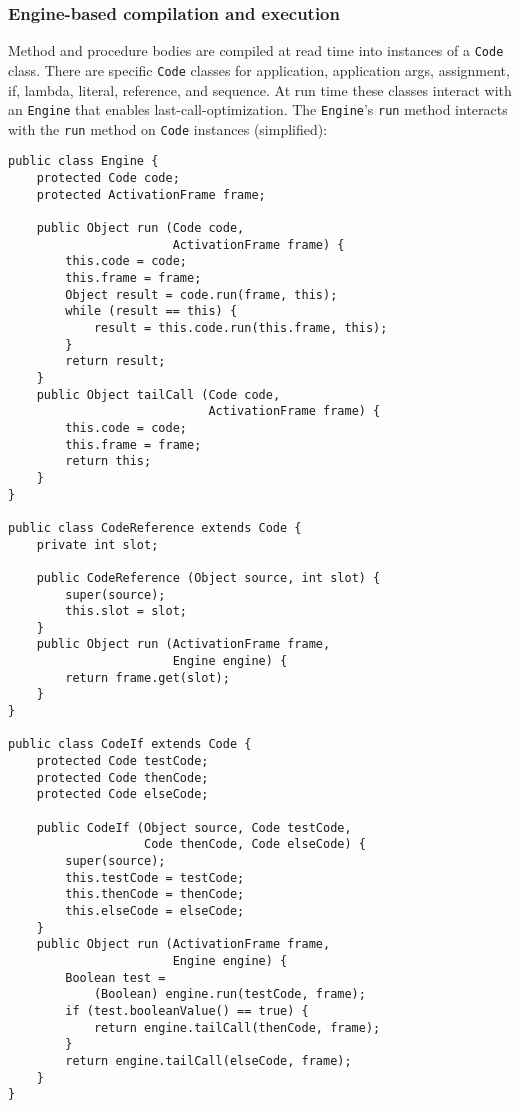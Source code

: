 \documentclass{acm_proc_article-sp}
\begin{document}
\subsubsection{Engine-based compilation and execution}

Method and procedure bodies are compiled at read time into instances
of a {\tt Code} class.  There are specific {\tt Code} classes for
application, application args, assignment, if, lambda, literal,
reference, and sequence.  At run time these classes interact with an
{\tt Engine} that enables last-call-optimization.  The {\tt Engine}'s
{\tt run} method interacts with the {\tt run} method on {\tt Code}
instances (simplified):

\small
\begin{verbatim}
public class Engine {
    protected Code code;
    protected ActivationFrame frame;

    public Object run (Code code,
                       ActivationFrame frame) {
        this.code = code;
        this.frame = frame;
        Object result = code.run(frame, this);
        while (result == this) {
            result = this.code.run(this.frame, this);
        }
        return result;
    }
    public Object tailCall (Code code,
                            ActivationFrame frame) {
        this.code = code;
        this.frame = frame;
        return this;
    }
}

public class CodeReference extends Code {
    private int slot;

    public CodeReference (Object source, int slot) {
        super(source);
        this.slot = slot;
    }
    public Object run (ActivationFrame frame,
                       Engine engine) {
        return frame.get(slot);
    }
}

public class CodeIf extends Code {
    protected Code testCode;
    protected Code thenCode;
    protected Code elseCode;

    public CodeIf (Object source, Code testCode,
                   Code thenCode, Code elseCode) {
        super(source);
        this.testCode = testCode;
        this.thenCode = thenCode;
        this.elseCode = elseCode;
    }
    public Object run (ActivationFrame frame,
                       Engine engine) {
        Boolean test =
            (Boolean) engine.run(testCode, frame);
        if (test.booleanValue() == true) {
            return engine.tailCall(thenCode, frame);
        }
        return engine.tailCall(elseCode, frame);
    }
}
\end{verbatim}
\normalsize
\end{document}
